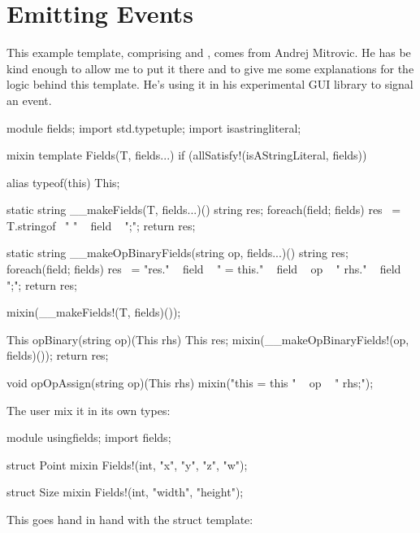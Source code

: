 \section{Emitting Events}

This example template, comprising  and , comes from Andrej Mitrovic. He has be kind enough to allow me to put it there and to give me some explanations for the logic behind this template. He's using it in his experimental GUI library to signal an event.

\begin{dcode}
module fields;
import std.typetuple;
import isastringliteral;

mixin template Fields(T, fields...) 
    if (allSatisfy!(isAStringLiteral, fields))
{
    alias typeof(this) This;

    static string __makeFields(T, fields...)()
    {
        string res;
        foreach(field; fields) res ~= T.stringof~ " " ~ field ~ ";\n";
        return res;
    }

    static string __makeOpBinaryFields(string op, fields...)()
    {
        string res;
        foreach(field; fields) 
            res ~= "res." ~ field 
                 ~ " = this." ~ field ~ op ~ " rhs." ~ field ~ ";\n";
        return res;
    }

    mixin(__makeFields!(T, fields)());

    This opBinary(string op)(This rhs)
    {
        This res;
        mixin(__makeOpBinaryFields!(op, fields)());
        return res;
    }

    void opOpAssign(string op)(This rhs)
    {
        mixin("this = this " ~ op ~ " rhs;");
    }                
}
\end{dcode}

The user mix it in its own types:

\begin{dcode}
module usingfields;
import fields;

struct Point {
    mixin Fields!(int, "x", "y", "z", "w");
}

struct Size {
    mixin Fields!(int, "width", "height");
}
\end{dcode}

This goes hand in hand with the  struct template:

